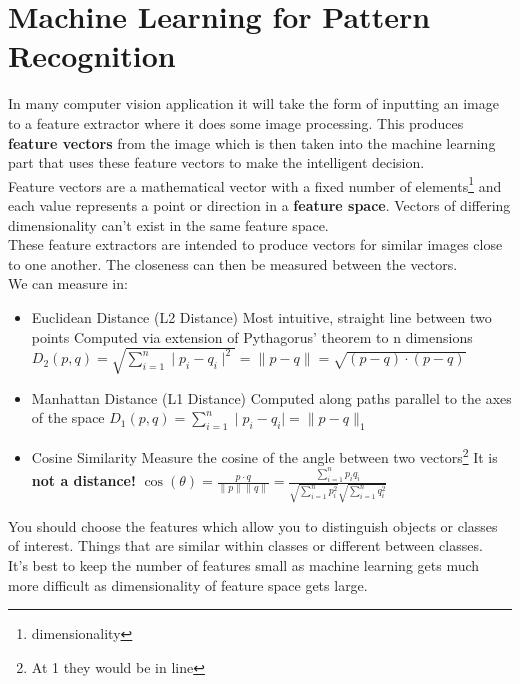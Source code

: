 \documentclass{article}
\begin{document}
	\section{Machine Learning for Pattern Recognition}
	In many computer vision application it will take the form of inputting an image to a feature extractor where it does some image processing. This produces \textbf{feature vectors} from the image which is then taken into the machine learning part that uses these feature vectors to make the intelligent decision.\\
	Feature vectors are a mathematical vector with a fixed number of elements\footnote{dimensionality} and each value represents a point or direction in a \textbf{feature space}. Vectors of differing dimensionality can't exist in the same feature space.\\
	These feature extractors are intended to produce vectors for similar images close to one another. The closeness can then be measured between the vectors.\\
	We can measure in:
	\begin{itemize}
		\item Euclidean Distance (L2 Distance)
		\subitem Most intuitive, straight line between two points
		\subitem Computed via extension of Pythagorus' theorem to n dimensions
		\subitem $D_2(p,q)=\sqrt{\sum_{i=1}^{n}\mid p_i-q_i\mid^2}=\parallel p-q\parallel = \sqrt{(p-q)\cdot(p-q)}$
		\item Manhattan Distance (L1 Distance)
		\subitem Computed along paths parallel to the axes of the space
		\subitem $D_1(p,q)=\sum_{i=1}^{n}\mid p_i-q_i\mid =\parallel p-q\parallel_1$
		\item Cosine Similarity
		\subitem Measure the cosine of the angle between two vectors\footnote{At 1 they would be in line}
		\subitem It is \textbf{not a distance!}
		\subitem$\cos(\theta)=\frac{p\cdot q}{\parallel p\parallel\parallel q\parallel}=\frac{\sum_{i=1}^{n}p_iq_i}{\sqrt{\sum_{i=1}^{n}p_i^2}\sqrt{\sum_{i=1}^{n}q_i^2}}$
	\end{itemize}
	You should choose the features which allow you to distinguish objects or classes of interest. Things that are similar within classes or different between classes.\\
	It's best to keep the number of features small as machine learning gets much more difficult as dimensionality of feature space gets large.
\end{document}
